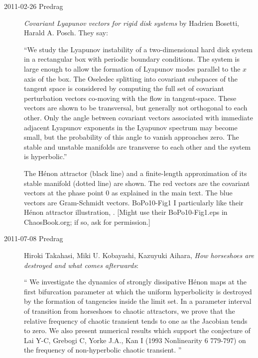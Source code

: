 \begin{description}

\item[2011-02-26 Predrag]
{\em Covariant Lyapunov vectors for rigid disk systems}
by Hadrien Bosetti, Harald A. Posch. They say:

``We study the Lyapunov instability of a two-dimensional hard disk system
in a rectangular box with periodic boundary conditions. The system is
large enough to allow the formation of Lyapunov modes parallel to the $x$
axis of the box. The Oseledec splitting into covariant subspaces of the
tangent space is considered by computing the full set of covariant
perturbation vectors co-moving with the flow in tangent-space. These
vectors are shown to be transversal, but generally not orthogonal to each
other. Only the angle between covariant vectors associated with immediate
adjacent Lyapunov exponents in the Lyapunov spectrum may become small,
but the probability of this angle to vanish approaches zero. The stable
and unstable manifolds are transverse to each other and the system is
hyperbolic.''

%
 {}{
The H\'enon attractor (black line) and a finite-length approximation of
its stable manifold (dotted line) are shown. The red vectors are the
covariant vectors at the phase point 0 as explained in the main text. The
blue vectors are Gram-Schmidt vectors.
}{BoPo10-Fig1}
%
I particularly like their H\'enon attractor illustration,
. [Might use their BoPo10-Fig1.eps in ChaosBook.org;
if so, ask for permission.]

\item[2011-07-08 Predrag]
Hiroki Takahasi, Miki U. Kobayashi, Kazuyuki Aihara,
\emph{How horseshoes are destroyed and what comes afterwards}:

``
We investigate the dynamics of strongly dissipative H\'enon maps at the
first bifurcation parameter at which the uniform hyperbolicity is
destroyed by the formation of tangencies inside the limit set. In a
parameter interval of transition from horseshoes to chaotic attractors,
we prove that the relative frequency of chaotic transient tends to one as
the Jacobian tends to zero. We also present numerical results which
support the conjecture of Lai Y-C, Grebogi C, Yorke J.A., Kan I (1993
Nonlinearity 6 779-797) on the frequency of non-hyperbolic chaotic
transient.
''


\end{description}
